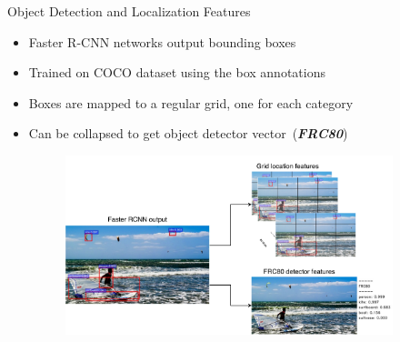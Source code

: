 \documentclass{beamer}
\begin{document}
\begin{frame}{Object Detection and Localization Features}
    \begin{itemize}
        \item Faster R-CNN networks output bounding boxes 
        \item Trained on COCO dataset using the box annotations 
        \item Boxes are mapped to a regular grid, one for each category 
        \item Can be collapsed to get object detector vector~(\textbf{\emph{FRC80}}) 
        \begin{figure}[h]
          \includegraphics[width=0.9\textwidth]{images/FrcnnFeats.pdf}
        \end{figure}

    \end{itemize}
\end{frame}
\end{document}
